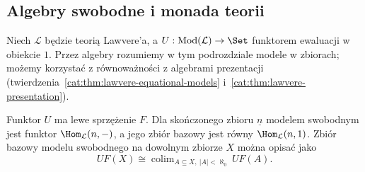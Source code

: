 \subsection{Algebry swobodne i monada teorii}

Niech $\mathcal L$ będzie teorią Lawvere'a, a $U:\operatorname{Mod}(\mathcal L)\to\Set$ funktorem ewaluacji w obiekcie $1$. Przez algebry rozumiemy w tym podrozdziale modele w zbiorach; możemy korzystać z równoważności z algebrami prezentacji (twierdzenia~\ref{cat:thm:lawvere-equational-models} i~\ref{cat:thm:lawvere-presentation}).

\begin{twierdzenie}\label{cat:thm:lawvere-free}
Funktor $U$ ma lewe sprzężenie $F$. Dla skończonego zbioru $\underline n$ modelem swobodnym jest funktor $\Hom_{\mathcal L}(n,-)$, a jego zbiór bazowy jest równy $\Hom_{\mathcal L}(n,1)$. Zbiór bazowy modelu swobodnego na dowolnym zbiorze $X$ można opisać jako
\[
 UF(X)\cong\operatorname{colim}_{A\subseteq X,\ |A|<\aleph_0}UF(A).
\]
\end{twierdzenie}
